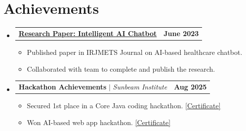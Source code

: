 \documentclass[letterpaper,11pt]{article}
\makeatletter
\newcommand{\resumeItem}[1]{
  \item\small{
    {#1 \vspace{-2pt}}
  }
}
\newcommand{\resumeProjectHeading}[2]{
    \item
    \begin{tabular*}{1.0\textwidth}{l@{\extracolsep{\fill}}r}
      \small#1 & \textbf{\small #2}\\
    \end{tabular*}\vspace{-7pt}
}
\newcommand{\resumeSubHeadingListStart}{\begin{itemize}[leftmargin=0.0in, label={}]}
\newcommand{\resumeSubHeadingListEnd}{\end{itemize}}
\newcommand{\resumeItemListStart}{\begin{itemize}}
\newcommand{\resumeItemListEnd}{\end{itemize}\vspace{-5pt}}
\makeatother
\begin{document}
\section{Achievements}
\resumeSubHeadingListStart

\resumeProjectHeading
{\href{https://www.irjmets.com/uploadedfiles/paper/issue_6_june_2023/41275/final/fin_irjmets1685775338.pdf}{\textbf{Research Paper: Intelligent AI Chatbot}}}{June 2023}
\resumeItemListStart
    \resumeItem{Published paper in IRJMETS Journal on AI-based healthcare chatbot.}
    \resumeItem{Collaborated with team to complete and publish the research.}
\resumeItemListEnd

\resumeProjectHeading
{\textbf{Hackathon Achievements} $|$ \emph{Sunbeam Institute}}{Aug 2025}
\resumeItemListStart
    \resumeItem{Secured 1st place in a Core Java coding hackathon. \href{https://drive.google.com/file/d/1yaOgQHlHAqEaQLD7dNfhg72f3rsC311q/view?usp=sharing}{[Certificate]}}
    \resumeItem{Won AI-based web app hackathon. \href{https://drive.google.com/file/d/19kYfNgfaISvFBiiZWRPuqWP8SwAr2I4j/view?usp=sharing}{[Certificate]}}
\resumeItemListEnd

\resumeSubHeadingListEnd
\end{document}
